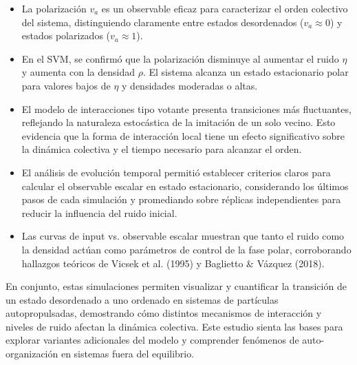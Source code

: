 \documentclass{article}
\begin{document}
\begin{itemize}
    \item La polarización \(v_a\) es un observable eficaz para caracterizar el orden colectivo del sistema, distinguiendo claramente entre estados desordenados (\(v_a \approx 0\)) y estados polarizados (\(v_a \approx 1\)).
    \item En el SVM, se confirmó que la polarización disminuye al aumentar el ruido \(\eta\) y aumenta con la densidad \(\rho\). El sistema alcanza un estado estacionario polar para valores bajos de \(\eta\) y densidades moderadas o altas.
    \item El modelo de interacciones tipo votante presenta transiciones más fluctuantes, reflejando la naturaleza estocástica de la imitación de un solo vecino. Esto evidencia que la forma de interacción local tiene un efecto significativo sobre la dinámica colectiva y el tiempo necesario para alcanzar el orden.
    \item El análisis de evolución temporal permitió establecer criterios claros para calcular el observable escalar en estado estacionario, considerando los últimos pasos de cada simulación y promediando sobre réplicas independientes para reducir la influencia del ruido inicial.
    \item Las curvas de input vs. observable escalar muestran que tanto el ruido como la densidad actúan como parámetros de control de la fase polar, corroborando hallazgos teóricos de Vicsek et al. (1995) y Baglietto \& Vázquez (2018).
\end{itemize}

En conjunto, estas simulaciones permiten visualizar y cuantificar la transición de un estado desordenado a uno ordenado en sistemas de partículas autopropulsadas, demostrando cómo distintos mecanismos de interacción y niveles de ruido afectan la dinámica colectiva. Este estudio sienta las bases para explorar variantes adicionales del modelo y comprender fenómenos de auto-organización en sistemas fuera del equilibrio.

\printbibliography[title={Referencias}]
\end{document}

